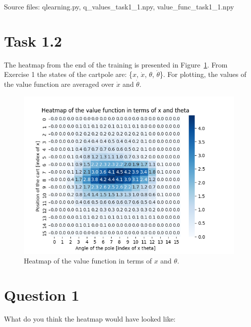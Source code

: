 \documentclass[12pt]{article}
\begin{document}
\pagebreak

\noindent
Source files: qlearning.py, q\_values\_task1\_1.npy, value\_func\_task1\_1.npy

\section*{Task 1.2}

The heatmap from the end of the training is presented in Figure~\ref*{fig:fig3}. From Exercise 1 the states of the cartpole are: \{$x$, $\dot{x}$, $\theta$, $\dot{\theta}$\}. For plotting, the values of the value function are averaged over $\dot{x}$ and $\dot{\theta}$. 
\newline

\begin{figure}[h] 
	\centering  %
    \includegraphics[width=0.9\columnwidth]{img/Figure_2_task1_2_heatmap_blues.png}
	\caption{Heatmap of the value function in terms of $x$ and $\theta$.}
	\label{fig:fig3}
\end{figure}

\section*{Question 1}

What do you think the heatmap would have looked like:
\end{document}
